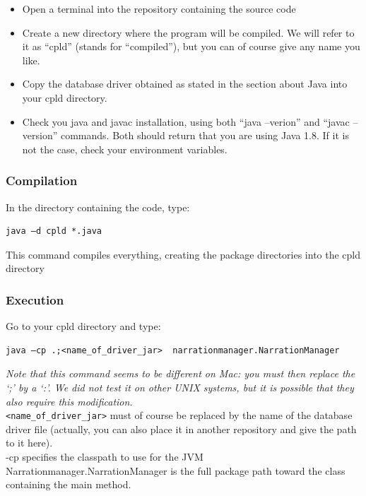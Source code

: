\documentclass[a4paper ,12pt,french]{article}
\begin{document}
\begin{itemize}
\item Open a terminal into the repository containing the source code
\item Create a new directory where the program will be compiled. We will refer to it as “cpld” (stands for “compiled”), but you can of course give any name you like.
\item Copy the database driver obtained as stated in the section about Java into your cpld directory.
\item Check you java and javac installation, using both “java –verion” and “javac –version” commands. Both should return that you are using Java 1.8. If it is not the case, check your environment variables.

\end{itemize}

\subsubsection{Compilation}

In the directory containing the code, type:
\begin{verbatim}
java –d cpld *.java
\end{verbatim}
This command compiles everything, creating the package directories into the cpld directory
\subsubsection{Execution}
Go to your cpld directory and type:

\begin{verbatim}
java –cp .;<name_of_driver_jar>  narrationmanager.NarrationManager
\end{verbatim}

\textit{Note that this command seems to be different on Mac: you must then replace the ‘;’ by a ‘:’. We did not test it on other UNIX systems, but it is possible that they also require this modification.}\\

\texttt{<name\_of\_driver\_jar>} must of course be replaced by the name of the database driver file (actually, you can also place it in another repository and give the path to it here).\\ 

-cp specifies the classpath to use for the JVM\\

Narrationmanager.NarrationManager is the full package path toward the class containing the main method.
\end{document}
